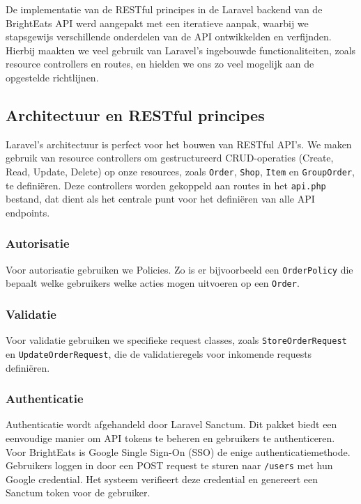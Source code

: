 De implementatie van de RESTful principes in de Laravel backend van de BrightEats API werd aangepakt met een iteratieve aanpak, waarbij we stapsgewijs verschillende onderdelen van de API ontwikkelden en verfijnden. Hierbij maakten we veel gebruik van Laravel's ingebouwde functionaliteiten, zoals resource controllers en routes, en hielden we ons zo veel mogelijk aan de opgestelde richtlijnen.

\subsection{Architectuur en RESTful principes}

Laravel's architectuur is perfect voor het bouwen van RESTful API's. We maken gebruik van resource controllers om gestructureerd CRUD-operaties (Create, Read, Update, Delete) op onze resources, zoals \texttt{Order}, \texttt{Shop}, \texttt{Item} en \texttt{GroupOrder}, te definiëren. Deze controllers worden gekoppeld aan routes in het \texttt{api.php} bestand, dat dient als het centrale punt voor het definiëren van alle API endpoints.

\subsubsection{Autorisatie}

Voor autorisatie gebruiken we Policies. Zo is er bijvoorbeeld een \texttt{OrderPolicy} die bepaalt welke gebruikers welke acties mogen uitvoeren op een \texttt{Order}.

\subsubsection{Validatie}

Voor validatie gebruiken we specifieke request classes, zoals \texttt{StoreOrderRequest} en \texttt{UpdateOrderRequest}, die de validatieregels voor inkomende requests definiëren.

\subsubsection{Authenticatie}

Authenticatie wordt afgehandeld door Laravel Sanctum. Dit pakket biedt een eenvoudige manier om API tokens te beheren en gebruikers te authenticeren. Voor BrightEats is Google Single Sign-On (SSO) de enige authenticatiemethode. Gebruikers loggen in door een POST request te sturen naar \texttt{/users} met hun Google credential. Het systeem verifieert deze credential en genereert een Sanctum token voor de gebruiker.

